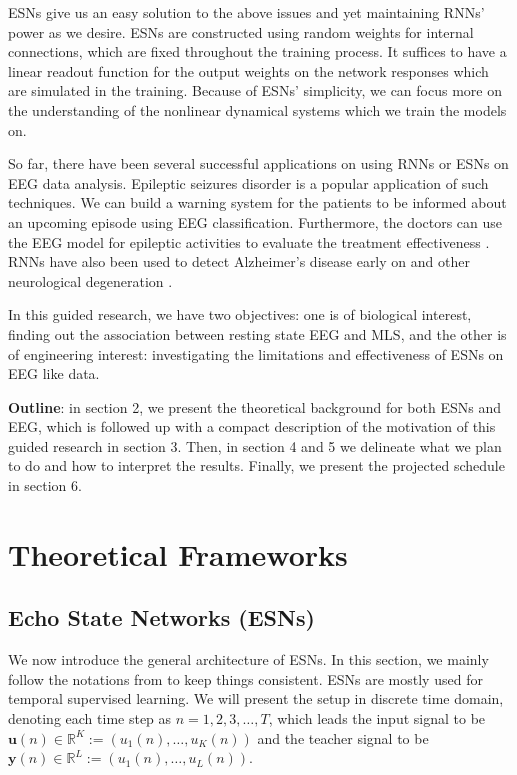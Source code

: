 \documentclass[a4paper,11pt,oneside]{article}
\begin{document}
ESNs give us an easy solution to the above issues and yet maintaining RNNs' power as we desire. ESNs are constructed using random weights for internal connections, which are fixed throughout the training process. It 
suffices to have a linear readout function for the output weights on the network responses which are simulated in the training.
Because of ESNs' simplicity, we can focus more on the understanding of the nonlinear dynamical systems which we train the models on.

So far, there have been several successful applications on using RNNs or ESNs on EEG data analysis. Epileptic seizures disorder is a popular application of such techniques. We can build a warning system for the patients to be informed about an upcoming episode using EEG classification. Furthermore, the doctors can use the EEG model for epileptic activities to evaluate the treatment effectiveness \cite{buteneers2008real} \cite{naderi2010analysis}.  RNNs have also been used to detect Alzheimer's disease early on and other neurological degeneration  \cite{petrosian2001recurrent}\cite{ubeyli2008multiclass}. 

In this guided research, we have two objectives: one is of biological interest, finding out the association between resting state EEG and MLS,
and the other is of engineering interest: investigating the limitations and effectiveness of ESNs on EEG like data.


\textbf{Outline}: in section 2, we present the theoretical background for both ESNs and EEG, which is followed up with a compact description of the motivation of this guided research in section 3. Then, in section 4 and 5 we delineate what we plan to 
do and how to interpret the results. Finally, we present the projected schedule in section 6. 

\section{Theoretical Frameworks}
\subsection{Echo State Networks (ESNs)}
We now introduce the general architecture of ESNs. In this section, we mainly  follow the notations from \cite{jaeger2001echo}\cite{lukovsevivcius2012practical} to keep things consistent. ESNs are mostly used for temporal supervised learning. We will present the setup in discrete time domain, denoting each time step as $ n = 1, 2, 3, \dots, T $, which leads the input signal to be $ \mathbf{u}(n) \in \mathbb{R}^K := (u_1(n), \dots, u_K(n))$ and the teacher signal to be 
$ \mathbf{y}(n) \in \mathbb{R}^L := (u_1(n), \dots, u_L(n))$. 
\end{document}
